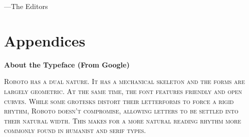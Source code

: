 \noindent\hspace*{2em} ---The Editors
\vspace*{\fill}

\setlength{\parskip}{0em}

\tableofcontents
\newpage
\titleformat{\chapter}[frame]{\Large}{\filright\enspace\thechapter\enspace}{2.5cm}{\Large\bfseries\filcenter}
\setlength{\parskip}{0.25em}

\setcounter{section}{1}



\mainmatter
\renewcommand{\thefootnote}{\arabic{footnote}}











\part*{Appendices}
\appendix


\newpage
\backmatter

\titleformat{\chapter}[hang]{\Large}{\filright\enspace\thechapter\enspace}{2.5cm}{\Large\bfseries\filcenter}

\printbibliography

\newpage
{}
\vspace*{0.15\paperheight}
\begin{center}\bfseries
About the Typeface (From Google)
\end{center}
\noindent\hfil\parbox[c][1.1\height][c]{0.5\textwidth}{\small\scshape
Roboto has a dual nature.
It has a mechanical skeleton and the forms are largely geometric.
At the same time, the font features friendly and open curves.
While some grotesks distort their letterforms to force a rigid rhythm, Roboto doesn’t compromise, allowing letters to be settled into their natural width.
This makes for a more natural reading rhythm more commonly found in humanist and serif types.}
\vspace*{\fill}

